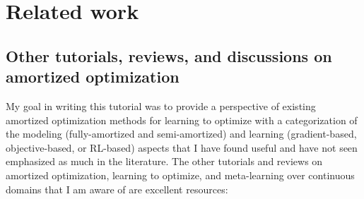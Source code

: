 \documentclass[twoside,11pt]{article}
\begin{document}
\section{Related work}
\subsection{Other tutorials, reviews, and discussions
  on amortized optimization}
My goal in writing this tutorial was to provide a perspective
of existing amortized optimization methods for learning
to optimize with a categorization of the
modeling (fully-amortized and semi-amortized)
and learning (gradient-based, objective-based, or RL-based)
aspects that I have found useful and have not seen
emphasized as much in the literature.
The other tutorials and reviews on
amortized optimization, learning to optimize, and
meta-learning over continuous domains
that I am aware of are excellent resources:
\end{document}
